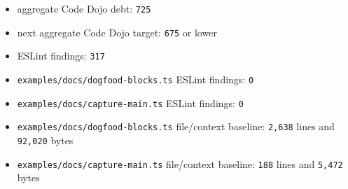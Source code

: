 \begin{itemize}
\tightlist
\item
  aggregate Code Dojo debt: \texttt{7\allowbreak{}2\allowbreak{}5}
\item
  next aggregate Code Dojo target: \texttt{6\allowbreak{}7\allowbreak{}5} or lower
\item
  ESLint findings: \texttt{3\allowbreak{}1\allowbreak{}7}
\item
  \texttt{e\allowbreak{}x\allowbreak{}a\allowbreak{}m\allowbreak{}p\allowbreak{}l\allowbreak{}e\allowbreak{}s\allowbreak{}/\allowbreak{}d\allowbreak{}o\allowbreak{}c\allowbreak{}s\allowbreak{}/\allowbreak{}d\allowbreak{}o\allowbreak{}g\allowbreak{}f\allowbreak{}o\allowbreak{}o\allowbreak{}d\allowbreak{}-\allowbreak{}b\allowbreak{}l\allowbreak{}o\allowbreak{}c\allowbreak{}k\allowbreak{}s\allowbreak{}.\allowbreak{}t\allowbreak{}s} ESLint findings: \texttt{0}
\item
  \texttt{e\allowbreak{}x\allowbreak{}a\allowbreak{}m\allowbreak{}p\allowbreak{}l\allowbreak{}e\allowbreak{}s\allowbreak{}/\allowbreak{}d\allowbreak{}o\allowbreak{}c\allowbreak{}s\allowbreak{}/\allowbreak{}c\allowbreak{}a\allowbreak{}p\allowbreak{}t\allowbreak{}u\allowbreak{}r\allowbreak{}e\allowbreak{}-\allowbreak{}m\allowbreak{}a\allowbreak{}i\allowbreak{}n\allowbreak{}.\allowbreak{}t\allowbreak{}s} ESLint findings: \texttt{0}
\item
  \texttt{e\allowbreak{}x\allowbreak{}a\allowbreak{}m\allowbreak{}p\allowbreak{}l\allowbreak{}e\allowbreak{}s\allowbreak{}/\allowbreak{}d\allowbreak{}o\allowbreak{}c\allowbreak{}s\allowbreak{}/\allowbreak{}d\allowbreak{}o\allowbreak{}g\allowbreak{}f\allowbreak{}o\allowbreak{}o\allowbreak{}d\allowbreak{}-\allowbreak{}b\allowbreak{}l\allowbreak{}o\allowbreak{}c\allowbreak{}k\allowbreak{}s\allowbreak{}.\allowbreak{}t\allowbreak{}s} file/context baseline: \texttt{2\allowbreak{},\allowbreak{}6\allowbreak{}3\allowbreak{}8} lines and \texttt{9\allowbreak{}2\allowbreak{},\allowbreak{}0\allowbreak{}2\allowbreak{}0} bytes
\item
  \texttt{e\allowbreak{}x\allowbreak{}a\allowbreak{}m\allowbreak{}p\allowbreak{}l\allowbreak{}e\allowbreak{}s\allowbreak{}/\allowbreak{}d\allowbreak{}o\allowbreak{}c\allowbreak{}s\allowbreak{}/\allowbreak{}c\allowbreak{}a\allowbreak{}p\allowbreak{}t\allowbreak{}u\allowbreak{}r\allowbreak{}e\allowbreak{}-\allowbreak{}m\allowbreak{}a\allowbreak{}i\allowbreak{}n\allowbreak{}.\allowbreak{}t\allowbreak{}s} file/context baseline: \texttt{1\allowbreak{}8\allowbreak{}8} lines and \texttt{5\allowbreak{},\allowbreak{}4\allowbreak{}7\allowbreak{}2} bytes

\end{itemize}
